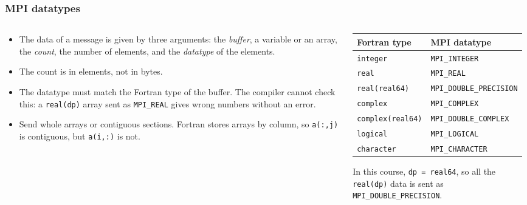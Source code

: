 \begin{frame}
  \frametitle{MPI datatypes}
  \begin{columns}[T]
    \begin{column}{0.5\textwidth}
      \begin{itemize}
        \item The data of a message is given by three arguments: the \emph{buffer}, a variable or an array, the \emph{count}, the number of elements, and the \emph{datatype} of the elements.
        \item The count is in elements, not in bytes.
        \item The datatype must match the Fortran type of the buffer. The compiler cannot check this: a \texttt{real(dp)} array sent as \texttt{MPI\_REAL} gives wrong numbers without an error.
        \item Send whole arrays or contiguous sections. Fortran stores arrays by column, so \texttt{a(:,j)} is contiguous, but \texttt{a(i,:)} is not.
      \end{itemize}
    \end{column}

    \begin{column}{0.5\textwidth}
      \centering
      \footnotesize
      \begin{tabular}{ll}
        \textbf{Fortran type} & \textbf{MPI datatype} \\
        \hline
        \texttt{integer}         & \texttt{MPI\_INTEGER} \\
        \texttt{real}            & \texttt{MPI\_REAL} \\
        \texttt{real(real64)}    & \texttt{MPI\_DOUBLE\_PRECISION} \\
        \texttt{complex}         & \texttt{MPI\_COMPLEX} \\
        \texttt{complex(real64)} & \texttt{MPI\_DOUBLE\_COMPLEX} \\
        \texttt{logical}         & \texttt{MPI\_LOGICAL} \\
        \texttt{character}       & \texttt{MPI\_CHARACTER} \\
        \hline
      \end{tabular}

      \vspace*{3mm}
      \raggedright
      In this course, \texttt{dp = real64}, so all the \texttt{real(dp)} data is sent as \texttt{MPI\_DOUBLE\_PRECISION}.
    \end{column}
  \end{columns}
\end{frame}


